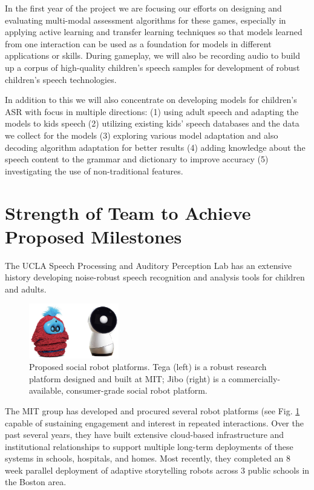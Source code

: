 In the first year of the project we are focusing our efforts on designing and evaluating multi-modal assessment algorithms for these games, especially in applying active learning and transfer learning techniques so that models learned from one interaction can be used as a foundation for models in different applications or skills. During gameplay, we will also be recording audio to build up a corpus of high-quality children's speech samples for development of robust children's speech technologies.

In addition to this we will also concentrate on developing models for children's ASR with focus in multiple directions: (1) using adult speech and adapting the models to kids speech (2) utilizing existing kids' speech databases and the data we collect for the models (3) exploring various model adaptation and also decoding algorithm adaptation for better results (4) adding knowledge about the speech content to the grammar and dictionary to improve accuracy (5) investigating the use of non-traditional features.
   
\section{Strength of Team to Achieve Proposed Milestones}

The UCLA Speech Processing and Auditory Perception Lab has an extensive history developing noise-robust speech recognition and analysis tools for children and adults.  

\begin{figure}
  \centering
  \includegraphics[width=0.35\textwidth]{fig/tega_jibo_combined.png}  
  \caption{Proposed social robot platforms. Tega (left) is a robust research platform designed and built at MIT; Jibo (right) is a commercially-available, consumer-grade social robot platform.}
  \label{fig:robots}
\end{figure}

The MIT group has developed and procured several robot platforms (see Fig. \ref{fig:robots} capable of sustaining engagement and interest in repeated interactions. Over the past several years, they have built extensive cloud-based infrastructure and institutional relationships to support multiple long-term deployments of these systems in schools, hospitals, and homes. Most recently, they completed an 8 week parallel deployment of adaptive storytelling robots across 3 public schools in the Boston area.

